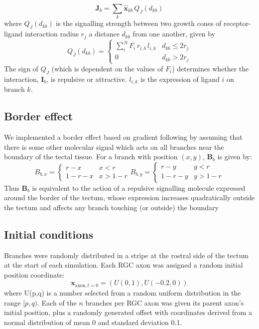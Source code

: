\documentclass[11pt, a4paper]{article}
\begin{document}
%
\begin{equation}
\mathbf{J}_b = \sum_k \hat{\mathbf{x}}_{kb}\,Q_J(d_{kb})
\end{equation}
%
where $Q_J(d_{kb})$ is the signalling strength between two growth cones of
receptor-ligand interaction radius $r_j$ a distance $d_{kb}$ from one another,
given by
%
\begin{equation}
Q_J(d_{kb}) = \begin{cases}
     \sum_i^N F_i\,r_{i,b}\,l_{i,k}    & d_{kb} \leq 2r_j \\
     0 & d_{kb} > 2r_j
     \end{cases}
\end{equation}
%
The sign of $Q_J$ (which is dependent on the values of $F_i$) determines whether
the interaction, $\mathbf{I}_b$, is repulsive or attractive. $l_{i,k}$ is the
expression of ligand $i$ on branch $k$.

\subsection*{Border effect}

We implemented a border effect based on gradient following by assuming that
there is some other molecular signal which acts on all branches near the
boundary of the tectal tissue. For a branch with position $(x,y)$, $\mathbf{B}_b$ is
given by:
%
\begin{equation}
B_{b,x} = \begin{cases}
        r-x      & x<r \\
        1-r-x    & x>1-r
\end{cases}
B_{b,y} = \begin{cases}
        r-y      & y<r \\
        1-r-y    & y>1-r
\end{cases}
\end{equation}
%
Thus $\mathbf{B}_b$ is equivalent to the action of a repulsive signalling
molecule expressed around the border of the tectum, whose expression increases
quadratically outside the tectum and affects any branch touching (or outside)
the boundary

\subsection*{Initial conditions}

Branches were randomly distributed in a stripe at the rostral side of the
tectum at the start of each simulation. Each RGC axon was assigned a random
initial position coordinate:
\begin{equation}
\mathbf{x}_{\text{axon},t=0} = (U(0,1), U(-0.2,0))
\end{equation}
where U(p,q) is a number selected from a random uniform distribution in the
range $[p,q)$. Each of the $n$ branches per RGC axon was given its parent
axon's initial position, plus a randomly generated offset with coordinates
derived from a normal distribution of mean 0 and standard deviation 0.1.
\end{document}
